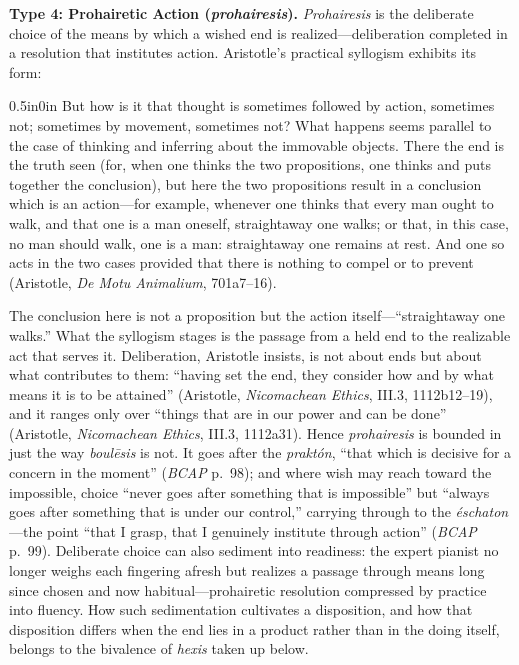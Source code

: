 \documentclass{article}
\begin{document}
\textbf{Type 4: Prohairetic Action (\textit{prohairesis}).} \textit{Prohairesis} is the deliberate choice of the means by which a wished end is realized---deliberation completed in a resolution that institutes action. Aristotle's practical syllogism exhibits its form:

\begin{adjustwidth}{0.5in}{0in}
But how is it that thought is sometimes followed by action, sometimes not; sometimes by movement, sometimes not? What happens seems parallel to the case of thinking and inferring about the immovable objects. There the end is the truth seen (for, when one thinks the two propositions, one thinks and puts together the conclusion), but here the two propositions result in a conclusion which is an action---for example, whenever one thinks that every man ought to walk, and that one is a man oneself, straightaway one walks; or that, in this case, no man should walk, one is a man: straightaway one remains at rest. And one so acts in the two cases provided that there is nothing to compel or to prevent (Aristotle, \textit{De Motu Animalium}, 701a7--16).
\end{adjustwidth}

The conclusion here is not a proposition but the action itself---``straightaway one walks.'' What the syllogism stages is the passage from a held end to the realizable act that serves it. Deliberation, Aristotle insists, is not about ends but about what contributes to them: ``having set the end, they consider how and by what means it is to be attained'' (Aristotle, \textit{Nicomachean Ethics}, III.3, 1112b12--19), and it ranges only over ``things that are in our power and can be done'' (Aristotle, \textit{Nicomachean Ethics}, III.3, 1112a31). Hence \textit{prohairesis} is bounded in just the way \textit{boulēsis} is not. It goes after the \textit{praktón}, ``that which is decisive for a concern in the moment'' (\textit{BCAP} p.~98); and where wish may reach toward the impossible, choice ``never goes after something that is impossible'' but ``always goes after something that is under our control,'' carrying through to the \textit{éschaton}---the point ``that I grasp, that I genuinely institute through action'' (\textit{BCAP} p.~99). Deliberate choice can also sediment into readiness: the expert pianist no longer weighs each fingering afresh but realizes a passage through means long since chosen and now habitual---prohairetic resolution compressed by practice into fluency. How such sedimentation cultivates a disposition, and how that disposition differs when the end lies in a product rather than in the doing itself, belongs to the bivalence of \textit{hexis} taken up below.
\end{document}
